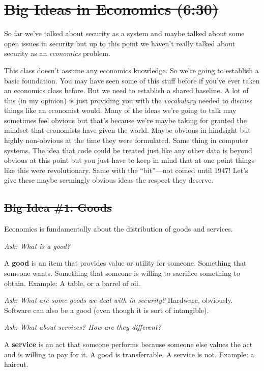 \documentclass[11pt]{article}
\begin{document}

\section{\sout{Big Ideas in Economics (6:30)}}

So far we've talked about security as a system and maybe talked about some open issues in security but up to this point we haven't really talked about security as an {\it economics} problem.

This class doesn't assume any economics knowledge. So we're going to establish a basic foundation.
You may have seen some of this stuff before if you've ever taken an economics class before.
But we need to establish a shared baseline. A lot of this (in my opinion) is just providing you with the {\it vocabulary} needed to discuss things like an economist would. Many of the ideas we're going to talk may sometimes feel obvious but that's because we're maybe taking for granted the mindset that economists have given the world. Maybe obvious in hindsight but highly non-obvious at the time they were formulated. Same thing in computer systems. The idea that code could be treated just like any other data is beyond obvious at this point but you just have to keep in mind that at one point things like this were revolutionary. Same with the ``bit''---not coined until 1947! Let's give these maybe seemingly obvious ideas the respect they deserve.


\subsection{\sout{Big Idea \#1: Goods}}

Economics is fundamentally about the distribution of goods and services. 

{\it Ask: What is a good?}

A {\bf good} is an item that provides value or utility for someone. Something that someone wants. Something that someone is willing to sacrifice something to obtain. Example: A table, or a barrel of oil.

{\it Ask: What are some goods we deal with in security?} Hardware, obviously. Software can also be a good (even though it is sort of intangible).

{\it Ask: What about services? How are they different?}

A {\bf service} is an act that someone performs because someone else values the act and is willing to pay for it. 
A good is transferrable. A service is not. 
Example: a haircut.
\end{document}
